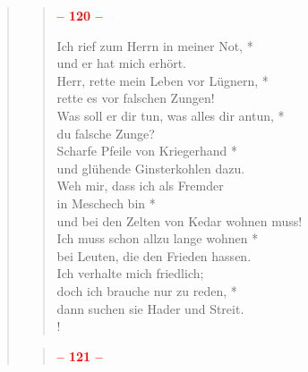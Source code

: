 \thispagestyle{plain}


\begin{quote}
\begin{verse}

\begin{center}
 \textcolor{red}{\normalsize\bf – 120 –}\\
\end{center}

\smallskip

Ich rief zum Herrn in meiner Not, *\\
und er hat mich erhört.\\
\vin Herr, rette mein Leben vor Lügnern, *\\
\vin rette es vor falschen Zungen!\\
Was soll er dir tun, was alles dir antun, *\\
du falsche Zunge?\\
\vin Scharfe Pfeile von Kriegerhand *\\
\vin und glühende Ginsterkohlen dazu.\\
Weh mir, dass ich als Fremder\\
in Meschech bin *\\
und bei den Zelten von Kedar wohnen muss!\\
\vin Ich muss schon allzu lange wohnen *\\
\vin bei Leuten, die den Frieden hassen.\\
Ich verhalte mich friedlich;\\
doch ich brauche nur zu reden, *\\
dann suchen sie Hader und Streit.\\!

\end{verse}

\begin{verse}

\begin{center}
 \textcolor{red}{\normalsize\bf – 121 –}\\
\end{center}

\smallskip



\end{verse}
\end{quote}
